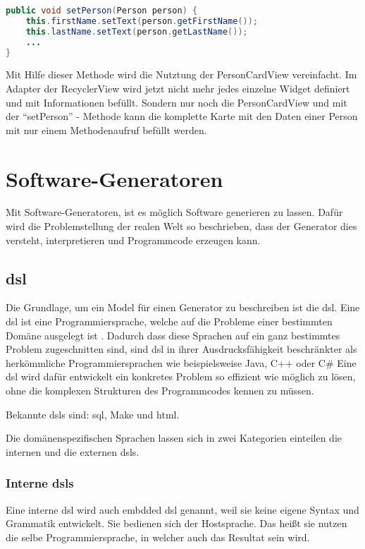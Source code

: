 \begin{lstlisting}[label=lst:setPerson,
language=java,
firstnumber=1,
caption=\textit{setPerson} - Methode aus der PersonCardView.]				   
public void setPerson(Person person) {
	this.firstName.setText(person.getFirstName());
	this.lastName.setText(person.getLastName());	
	...
}
\end{lstlisting}

Mit Hilfe dieser Methode wird die Nutztung der PersonCardView vereinfacht. Im Adapter der RecyclerView wird jetzt nicht mehr jedes einzelne Widget definiert und mit Informationen befüllt. Sondern nur noch die PersonCardView und mit der \enquote{setPerson} - Methode kann die komplette Karte mit den Daten einer Person mit nur einem Methodenaufruf befüllt werden.

\section{Software-Generatoren}\label{sec:generators}

Mit Software-Generatoren, ist es möglich Software generieren zu lassen. Dafür wird die Problemstellung der realen Welt so beschrieben, dass der Generator dies versteht, interpretieren und Programmcode erzeugen kann.

\subsection{\acf{dsl}}\label{sec:dsl}
Die Grundlage, um ein Model für einen Generator zu beschreiben ist die \acl{dsl}.
Eine \acs{dsl} ist eine Programmiersprache, welche auf die Probleme einer bestimmten Domäne ausgelegt ist \cite{dslHudak}. Dadurch dass diese Sprachen auf ein ganz bestimmtes Problem zugeschnitten sind, sind \acl{dsl} in ihrer Ausdrucksfähigkeit beschränkter als herkömmliche Programmiersprachen wie beispielsweise Java, C++ oder C\# Eine \acl{dsl} wird dafür entwickelt ein konkretes Problem so effizient wie möglich zu lösen, ohne die komplexen Strukturen des Programmcodes kennen zu müssen.

Bekannte \aclp{dsl} sind: \ac{sql}, Make und \acf{html}.

Die domänenspezifischen Sprachen lassen sich in zwei Kategorien einteilen die internen und die externen \acsp{dsl}.

\subsubsection{Interne \acsp{dsl}} \label{sec:intern}
Eine interne \acs{dsl} wird auch embdded \acs{dsl} genannt, weil sie keine eigene Syntax und Grammatik entwickelt. Sie bedienen sich der Hostsprache. Das heißt sie nutzen die selbe Programmiersprache, in welcher auch das Resultat sein wird.

